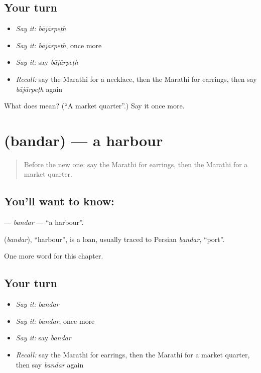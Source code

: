 \subsection*{Your turn}
\begin{itemize}
\raggedright
  \item \emph{Say it:} \emph{bājārpeṭh}
  \item \emph{Say it:} \emph{bājārpeṭh}, once more
  \item \emph{Say it:} say \emph{bājārpeṭh}
  \item \emph{Recall:} say the Marathi for a necklace, then the Marathi for earrings, then say \emph{bājārpeṭh} again
\end{itemize}

\begin{tcolorbox}[breakable,colback=teal!4,colframe=teal!35!black,title={Before you move on}]
What does  mean? (\textquotedblleft{}A market quarter\textquotedblright{}.) Say it once more.
\end{tcolorbox}
\section[\texorpdfstring{\mr{बंदर} (bandar)}{बंदर (bandar)}]{ (bandar) — a harbour}

\label{lesson:MR-C217-bandar}



\begin{quote}
Before the new one: say the Marathi for earrings, then the Marathi for a market quarter.
\end{quote}

\subsection*{You'll want to know: }
\textbf{} — \emph{bandar} — \textquotedblleft{}a harbour\textquotedblright{}.

\begin{cousinweb}
\textbf{} (\emph{bandar}), \textquotedblleft{}harbour\textquotedblright{}, is a loan, usually traced to Persian \emph{bandar}, \textquotedblleft{}port\textquotedblright{}.
\end{cousinweb}

\begin{grammarlens}[title={What you've built}]
One more word for this chapter.
\end{grammarlens}

\subsection*{Your turn}
\begin{itemize}
\raggedright
  \item \emph{Say it:} \emph{bandar}
  \item \emph{Say it:} \emph{bandar}, once more
  \item \emph{Say it:} say \emph{bandar}
  \item \emph{Recall:} say the Marathi for earrings, then the Marathi for a market quarter, then say \emph{bandar} again
\end{itemize}

